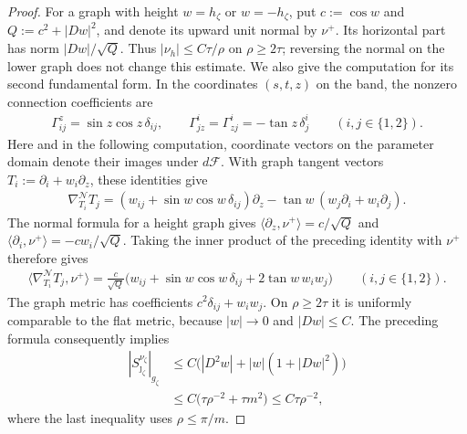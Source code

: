 \documentclass[a4paper,11pt,oneside,reqno]{amsart}
\numberwithin{equation}{section}
\theoremstyle{definition}
\begin{document}
\begin{proof}
    For a graph with height $w=h_\zeta$ or $w=-h_\zeta$,
    put $c:=\cos w$ and $Q:=c^2+|Dw|^2$, and denote
    its upward unit normal by $\nu^+$. Its horizontal
    part has norm $|Dw|/\sqrt Q$. Thus
    $|\nu_h|\leq C\tau/\rho$ on $\rho\geq2\tau$;
    reversing the normal on the lower graph does not
    change this estimate. We also give the computation
    for its second fundamental form. In the coordinates
    $(s,t,z)$ on the band, the nonzero connection
    coefficients are
    \begin{align*}
        \Gamma^z_{ij}=\sin z\cos z\,\delta_{ij},
        \qquad
        \Gamma^i_{jz}=\Gamma^i_{zj}
            =-\tan z\,\delta^i_j
        \qquad(i,j\in\{1,2\}).
    \end{align*}
    Here and in the following computation, coordinate
    vectors on the parameter domain denote their images
    under $d\mathcal F$. With graph tangent vectors
    $T_i:=\partial_i+w_i\partial_z$, these identities give
    \begin{align*}
        \nabla^{\mathcal N}_{T_i}T_j
        =(w_{ij}+\sin w\cos w\,\delta_{ij})\partial_z
          -\tan w\,(w_j\partial_i+w_i\partial_j).
    \end{align*}
    The normal formula for a height graph gives
    $\langle\partial_z,\nu^+\rangle=c/\sqrt Q$ and
    $\langle\partial_i,\nu^+\rangle=-cw_i/\sqrt Q$.
    Taking the inner product of the preceding identity
    with $\nu^+$ therefore gives
    \begin{align*}
        \bigl\langle\nabla^{\mathcal N}_{T_i}T_j,\nu^+\bigr\rangle
        =\frac{c}{\sqrt Q}
          \bigl(w_{ij}+\sin w\cos w\,\delta_{ij}
                       +2\tan w\,w_iw_j\bigr)
        \qquad(i,j\in\{1,2\}).
    \end{align*}
    The graph metric has coefficients
    $c^2\delta_{ij}+w_iw_j$. On $\rho\geq2\tau$ it is
    uniformly comparable to the flat metric, because
    $|w|\to0$ and $|Dw|\leq C$. The preceding formula
    consequently implies
    \begin{align*}
        |S_{\jmath_\zeta}^{\nu_\zeta}|_{g_\zeta}
        &\leq C\bigl(|D^2w|
                    +|w|(1+|Dw|^2)\bigr)\\
        &\leq C\bigl(\tau\rho^{-2}+\tau m^2\bigr)
         \leq C\tau\rho^{-2},
    \end{align*}
    where the last inequality uses $\rho\leq\pi/m$.


\end{proof}
\end{document}
